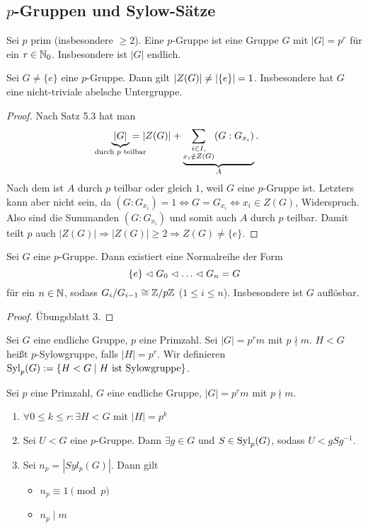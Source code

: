 \documentclass[12pt,a4paper]{scrartcl}
\begin{document}
\subsection{$p$-Gruppen und Sylow-Sätze}
\begin{defi}
	Sei $p$ prim (insbesondere $\geq 2$). Eine $p$-Gruppe ist eine Gruppe $G$ mit $|G| = p^r$ für ein $r\in\IN_0$. Insbesondere ist $|G|$ endlich.
\end{defi}
\begin{satz}
	Sei $G\neq\{e\}$ eine $p$-Gruppe. Dann gilt $\abs{Z(G)}\neq \abs*{\{e\}} = 1$. Insbesondere hat $G$ eine nicht-triviale abelsche Untergruppe.
\end{satz}
\begin{proof}
	Nach Satz 5.3 hat man \[ \underbrace{|G|}_{\mathclap{\text{durch $p$ teilbar}}}  = |Z(G)| + \underbrace{\sum_{\substack{i\in I,\\x_i\notin Z(G)}}(G: G_{x_i})}_{A}.\] Nach dem  ist $A$ durch $p$ teilbar oder gleich $1$, weil $G$ eine $p$-Gruppe ist. Letzters kann aber nicht sein, da $(G:G_{x_i}) = 1 \Leftrightarrow G = G_{x_i}\Leftrightarrow x_i\in Z(G)$, Widerspruch. Also sind die Summanden $(G:G_{x_i})$ und somit auch $A$ durch $p$ teilbar. Damit teilt $p$ auch $|Z(G)|\Rightarrow |Z(G)|\geq 2\Rightarrow Z(G)\neq \{e\}$.
\end{proof}

\begin{satz}
	Sei $G$ eine $p$-Gruppe. Dann existiert eine Normalreihe der Form
	$$ \{e\}\nt G_0\nt\dots\nt G_n = G$$ für ein $n\in\IN$, sodass $G_i/G_{i-1}\cong \IZ/p\IZ$ ($1\le i\le n$).
	Insbesondere ist $G$ auflösbar.
\end{satz}
\begin{proof}
	Übungsblatt 3.
\end{proof}

\begin{defi}
	Sei $G$ eine endliche Gruppe, $p$ eine Primzahl. Sei $|G| = p^rm$ mit $p\nmid m$. $H<G$ heißt $p$-Sylowgruppe, falls $|H| = p^r$. Wir definieren  $\Syl_p(G):=\{H<G\mid H\text{ ist Sylowgruppe}\}$.
\end{defi}

\begin{satz}[Sylowsätze]
	Sei $p$ eine Primzahl, $G$ eine endliche Gruppe, $|G| = p^rm$ mit $p\nmid m$.\begin{enumerate}
		\item $\forall 0\le k\le r \colon\exists H<G$ mit $|H| = p^k$
		\item Sei $U<G$ eine $p$-Gruppe. Dann $\exists g\in G$ und $S\in \Syl_p(G)$, sodass $U<gSg^{-1}$.
		\item Sei $n_p = |Syl_p(G)|$. Dann gilt \begin{itemize}
			\item $n_p\equiv 1\pmod p$
			\item $n_p\mid m$
		\end{itemize}
	\end{enumerate}
\end{satz}
\end{document}
